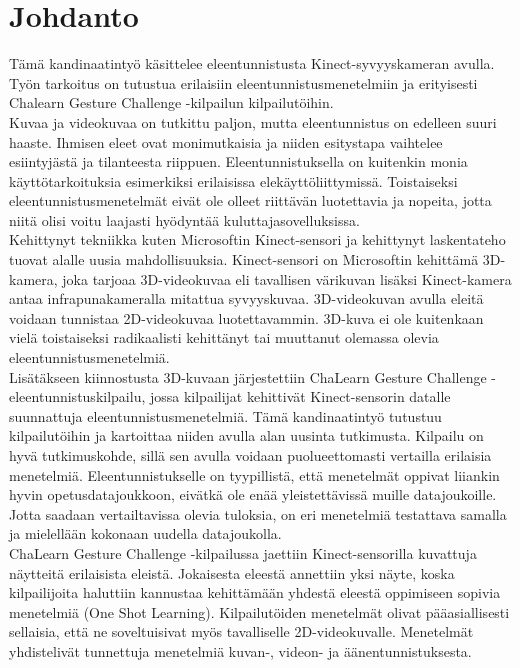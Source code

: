 
\section{Johdanto}

Tämä kandinaatintyö käsittelee eleentunnistusta Kinect-syvyyskameran avulla. 
Työn tarkoitus on tutustua erilaisiin eleentunnistusmenetelmiin ja erityisesti Chalearn Gesture Challenge -kilpailun kilpailutöihin. 
\\

Kuvaa ja videokuvaa on tutkittu paljon, mutta eleentunnistus on edelleen suuri haaste. Ihmisen eleet
ovat monimutkaisia ja niiden esitystapa vaihtelee esiintyjästä ja tilanteesta riippuen. Eleentunnistuksella
on kuitenkin monia käyttötarkoituksia esimerkiksi erilaisissa elekäyttöliittymissä. Toistaiseksi
eleentunnistusmenetelmät eivät ole olleet riittävän luotettavia ja nopeita, jotta niitä olisi voitu
laajasti hyödyntää kuluttajasovelluksissa.\\

Kehittynyt tekniikka kuten Microsoftin Kinect-sensori ja kehittynyt laskentateho tuovat alalle uusia mahdollisuuksia. 
Kinect-sensori on Microsoftin kehittämä 3D-kamera, joka tarjoaa 3D-videokuvaa eli tavallisen värikuvan 
lisäksi Kinect-kamera antaa infrapunakameralla mitattua syvyyskuvaa. 
3D-videokuvan avulla eleitä voidaan tunnistaa 2D-videokuvaa luotettavammin. 3D-kuva ei ole kuitenkaan 
vielä toistaiseksi radikaalisti kehittänyt tai muuttanut olemassa olevia eleentunnistusmenetelmiä.\\

Lisätäkseen kiinnostusta 3D-kuvaan järjestettiin ChaLearn Gesture Challenge -eleentunnistuskilpailu, 
jossa kilpailijat kehittivät Kinect-sensorin datalle suunnattuja 
eleentunnistusmenetelmiä. Tämä kandinaatintyö tutustuu kilpailutöihin ja kartoittaa niiden avulla alan uusinta tutkimusta. Kilpailu on hyvä tutkimuskohde,
sillä sen avulla voidaan puolueettomasti vertailla erilaisia menetelmiä. Eleentunnistukselle on tyypillistä, 
että menetelmät oppivat liiankin hyvin opetusdatajoukkoon, eivätkä ole enää yleistettävissä muille datajoukoille.
Jotta saadaan vertailtavissa olevia tuloksia, on eri menetelmiä testattava samalla ja mielellään kokonaan uudella datajoukolla.\\

ChaLearn Gesture Challenge -kilpailussa jaettiin Kinect-sensorilla kuvattuja näytteitä erilaisista eleistä.
Jokaisesta eleestä annettiin yksi näyte, koska kilpailijoita haluttiin kannustaa kehittämään yhdestä 
eleestä oppimiseen sopivia menetelmiä (One Shot Learning). Kilpailutöiden menetelmät olivat pääasiallisesti sellaisia,
että ne soveltuisivat myös tavalliselle 2D-videokuvalle. Menetelmät yhdistelivät tunnettuja menetelmiä kuvan-, videon- ja äänentunnistuksesta.\\

